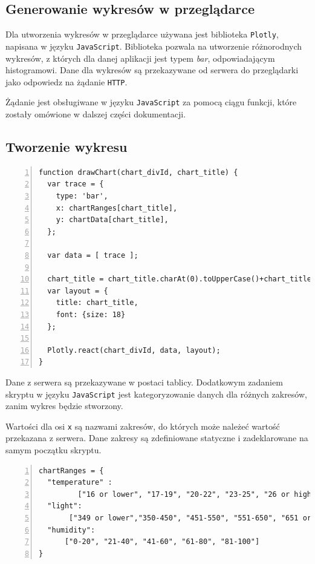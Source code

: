 \documentclass[a4paper]{article}
\begin{document}
    \subsection{Generowanie wykresów w przeglądarce}
	Dla utworzenia wykresów w przeglądarce używana jest biblioteka \texttt{Plotly}, napisana w języku \texttt{JavaScript}.
	Biblioteka pozwala na utworzenie różnorodnych wykresów, z których dla danej aplikacji jest typem \textsl{bar}, odpowiadającym histogramowi. 
	Dane dla wykresów są przekazywane od serwera do przeglądarki jako odpowiedz na żądanie \texttt{HTTP}.

	Żądanie jest obsługiwane w języku \texttt{JavaScript} za pomocą ciągu funkcji, które zostały omówione w dalszej części dokumentacji.

    \subsection{Tworzenie wykresu}
    \begin{lstlisting}[frame=single, numbers=left, basicstyle=\ttfamily\small,
    caption={Funkcja do tworzenia histogramu za pomocą biblioteki \textsl{Plotly.js}}]
function drawChart(chart_divId, chart_title) {
  var trace = {
    type: 'bar',
    x: chartRanges[chart_title],
    y: chartData[chart_title],
  };

  var data = [ trace ];

  chart_title = chart_title.charAt(0).toUpperCase()+chart_title.slice(1);
  var layout = {
    title: chart_title,
    font: {size: 18}
  };

  Plotly.react(chart_divId, data, layout);
}
    \end{lstlisting}

    Dane z serwera są przekazywane w postaci tablicy. 
    Dodatkowym zadaniem skryptu w języku \texttt{JavaScript} jest kategoryzowanie danych
    dla różnych zakresów, zanim wykres będzie stworzony.

    Wartości dla osi \texttt{x} są nazwami zakresów, 
    do których może należeć wartość przekazana z serwera. 
    Dane zakresy są zdefiniowane statyczne i zadeklarowane na samym początku skryptu.
    \begin{lstlisting}[frame=single, numbers=left, basicstyle=\ttfamily\small,
caption={Zdefiniowany zakresy w skrypcie \texttt{JavaScript}}]
chartRanges = {
  "temperature" :
	     ["16 or lower", "17-19", "20-22", "23-25", "26 or higher"],
  "light": 
       ["349 or lower","350-450", "451-550", "551-650", "651 or higher"],
  "humidity":
	  ["0-20", "21-40", "41-60", "61-80", "81-100"]
}
    \end{lstlisting}
\end{document}

